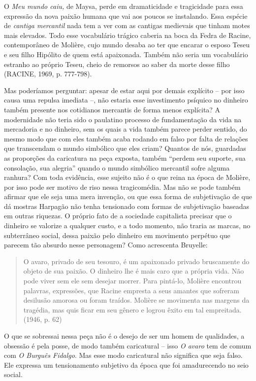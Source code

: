 O \emph{Meu mundo caiu,} de Maysa, perde em dramaticidade e tragicidade
para essa expressão da nova paixão humana que vai aos poucos se
instalando. Essa espécie de \emph{cantiga mercantil} nada tem a ver com
as cantigas medievais que tinham motes mais elevados. Todo esse
vocabulário trágico caberia na boca da Fedra de Racine, contemporâneo de
Molière, cujo mundo desaba ao ter que encarar o esposo Teseu e seu filho
Hipólito de quem está apaixonada. Também não seria um vocabulário
estranho ao próprio Teseu, cheio de remorsos ao saber da morte desse
filho (RACINE, 1969, p. 777-798).

Mas poderíamos perguntar: apesar de estar aqui por demais explícito --
por isso causa uma repulsa imediata --, não estaria esse investimento
psíquico no dinheiro também presente nos cotidianos mercantis de forma
menos explícita? A modernidade não teria sido o paulatino processo de
fundamentação da vida na mercadoria e no dinheiro, sem os quais a vida
também parece perder sentido, do mesmo modo que com eles também acaba
rodando em falso por falta de relações que transcendam o mundo simbólico
que eles criam? Quantos de nós, guardadas as proporções da caricatura na
peça exposta, também ``perdem seu suporte, sua consolação, sua alegria''
quando o mundo simbólico mercantil sofre alguma ranhura? Com toda
evidência, esse sujeito não é o que reina na época de Molière, por isso
pode ser motivo de riso nessa tragicomédia. Mas não se pode também
afirmar que ele seja uma mera invenção, ou que essa forma de
subjetivação de que dá mostras Harpagão não tenha tensionado com formas
de subjetivação baseadas em outras riquezas. O próprio fato de a
sociedade capitalista precisar que o dinheiro se valorize a qualquer
custo, e a todo momento, não traria as marcas, no subterrâneo social,
dessa paixão pelo dinheiro em movimento perpétuo que parecem tão absurdo
nesse personagem? Como acrescenta Bruyelle:

\begin{quote}
O avaro, privado de seu tesouro, é um apaixonado privado bruscamente do
objeto de sua paixão. O dinheiro lhe é mais caro que a própria vida. Não
pode viver sem ele sem desejar morrer. Para pintá-lo, Molière encontrou
palavras, expressões, que Racine empresta a seus amantes que sofreram
desilusão amorosa ou foram traídos. Molière se movimenta nas margens da
tragédia, mas quis ficar em seu gênero e logrou êxito em tal empreitada.
(1946, p. 62)
\end{quote}

O que se sobressai nessa peça não é o desejo de ser um homem de
qualidades, a obsessão é pela posse, de modo também caricatural -- isso
\emph{O avaro} tem de comum com \emph{O Burguês Fidalgo}. Mas esse modo
caricatural não significa que seja falso. Ele expressa um tensionamento
subjetivo da época que foi amadurecendo no seio social.

